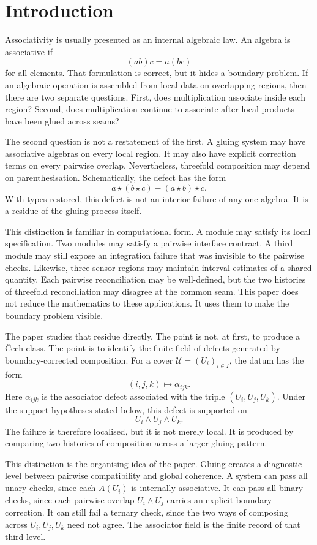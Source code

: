 \documentclass[11pt]{article}
\begin{document}
\section{Introduction}

Associativity is usually presented as an internal algebraic law. An algebra is associative if
\[
(ab)c = a(bc)
\]
for all elements. That formulation is correct, but it hides a boundary problem. If an algebraic operation is assembled from local data on overlapping regions, then there are two separate questions. First, does multiplication associate inside each region? Second, does multiplication continue to associate after local products have been glued across seams?

The second question is not a restatement of the first. A gluing system may have associative algebras on every local region. It may also have explicit correction terms on every pairwise overlap. Nevertheless, threefold composition may depend on parenthesisation. Schematically, the defect has the form
\[
a \star (b \star c) - (a \star b) \star c.
\]
With types restored, this defect is not an interior failure of any one algebra. It is a residue of the gluing process itself.

This distinction is familiar in computational form. A module may satisfy its local specification. Two modules may satisfy a pairwise interface contract. A third module may still expose an integration failure that was invisible to the pairwise checks. Likewise, three sensor regions may maintain interval estimates of a shared quantity. Each pairwise reconciliation may be well-defined, but the two histories of threefold reconciliation may disagree at the common seam. This paper does not reduce the mathematics to these applications. It uses them to make the boundary problem visible.

The paper studies that residue directly. The point is not, at first, to produce a \v{C}ech class. The point is to identify the finite field of defects generated by boundary-corrected composition. For a cover \(\mathcal U=(U_i)_{i\in I}\), the datum has the form
\[
(i,j,k) \longmapsto \alpha_{ijk}.
\]
Here \(\alpha_{ijk}\) is the associator defect associated with the triple \((U_i,U_j,U_k)\). Under the support hypotheses stated below, this defect is supported on
\[
U_i\wedge U_j\wedge U_k.
\]
The failure is therefore localised, but it is not merely local. It is produced by comparing two histories of composition across a larger gluing pattern.

This distinction is the organising idea of the paper. Gluing creates a diagnostic level between pairwise compatibility and global coherence. A system can pass all unary checks, since each \(A(U_i)\) is internally associative. It can pass all binary checks, since each pairwise overlap \(U_i\wedge U_j\) carries an explicit boundary correction. It can still fail a ternary check, since the two ways of composing across \(U_i,U_j,U_k\) need not agree. The associator field is the finite record of that third level.
\end{document}
